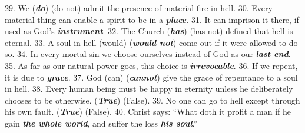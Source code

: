 \documentclass[a4paper,14pt]{memoir}
\newcommand\answer[1]{\textbf{\textit{#1}}}
\begin{document}
29. We (\answer{do}) (do not) admit the presence of material fire in hell. 
30.  Every
material thing can enable a spirit to be in a \answer{place}. 
31.  It  can  imprison
it there, if used as God's \answer{instrument}. 
32. The Church (\answer{has})  (has  not)  defined
that hell is eternal. 
33. A soul in hell (would) (\answer{would not}) come out if  it
were allowed to do so. 
34. In every mortal sin we choose  ourselves  instead
of God as our \answer{last end}. 
35. As far as our natural power goes, this  choice  is
\answer{irrevocable}. 
36. If we repent, it is due to \answer{grace}. 
37. God (can)  (\answer{cannot})  give
the grace of repentance to a soul in hell. 
38. Every  human  being  must  be
happy in eternity unless he deliberately chooses  to  be  otherwise.  (\answer{True})
(False). 
39. No one can go to hell except  through  his  own  fault.  (\answer{True})
(False). 
40. Christ says: “What doth it profit a man if he gain \answer{the whole world},  and
suffer the loss \answer{his soul}.”
\end{document}
